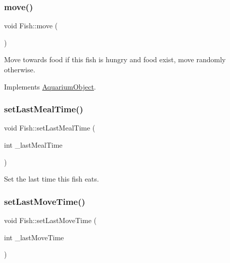 \mbox{\label{class_fish_a1a18368573aab3b14a83aaf2424630ec}} 
\subsubsection{\texorpdfstring{move()}{move()}}
{\footnotesize\ttfamily void Fish\+::move (\begin{DoxyParamCaption}{ }\end{DoxyParamCaption})\hspace{0.3cm}{\ttfamily [virtual]}}



Move towards food if this fish is hungry and food exist, move randomly otherwise. 



Implements \mbox{\hyperlink{class_aquarium_object_a42c4de640f89ac8aebc26b7618578575}{Aquarium\+Object}}.

\mbox{\label{class_fish_a1f7311b9420fb5024765db52bcdb6cf3}} 
\subsubsection{\texorpdfstring{set\+Last\+Meal\+Time()}{setLastMealTime()}}
{\footnotesize\ttfamily void Fish\+::set\+Last\+Meal\+Time (\begin{DoxyParamCaption}\item[{int}]{\+\_\+last\+Meal\+Time }\end{DoxyParamCaption})}



Set the last time this fish eats. 

\mbox{\label{class_fish_a49b56a52b365b3b492e519e4b27bc441}} 
\subsubsection{\texorpdfstring{set\+Last\+Move\+Time()}{setLastMoveTime()}}
{\footnotesize\ttfamily void Fish\+::set\+Last\+Move\+Time (\begin{DoxyParamCaption}\item[{int}]{\+\_\+last\+Move\+Time }\end{DoxyParamCaption})}



